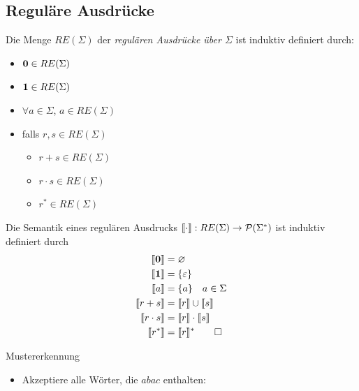 {\subsection{Reguläre Ausdrücke}
\begin{Def}[name={[RE($\Sigma$)]}]
        Die Menge $RE(\Sigma)$ der \emph{regulären Ausdrücke über $\Sigma$} ist induktiv definiert durch:
        \begin{itemize}
        \item $\mathbf{0}\in RE(\Sigma)$
        \item $\mathbf{1}\in RE(\Sigma)$
        \item $\forall a\in\Sigma$, $a\in RE(\Sigma)$
        \item falls $r,s\in RE(\Sigma)$
                \begin{itemize}[label=\textbullet]
                \item $r+s\in RE(\Sigma)$
                \item $r\cdot s\in RE(\Sigma)$
                \item $r^*\in RE(\Sigma)$
                \end{itemize}
        \end{itemize}
\end{Def}
\begin{Def}[name={[Semantik eines regulären Ausdrucks]}]
        Die Semantik eines regulären Ausdrucks $\llbracket\cdot \rrbracket : RE(\Sigma) \-> \mathcal{P}(\Sigma^*)$ ist induktiv definiert durch
        \begin{align*}
                \llbracket \mathbf{0} \rrbracket &= \varnothing\\
                \llbracket \mathbf{1} \rrbracket &= \{\varepsilon\}\\
                \llbracket a \rrbracket &= \{a\} \quad a\in\Sigma\\
                \llbracket r+s \rrbracket &= \llbracket r\rrbracket \cup \llbracket s\rrbracket\\
                \llbracket r\cdot s \rrbracket &= \llbracket r\rrbracket \cdot \llbracket s\rrbracket\\
                \llbracket r^* \rrbracket &= \llbracket r\rrbracket^* \qedhere
        \end{align*}
\end{Def}
%
    \begin{Bsp*} Mustererkennung
        \begin{itemize}
        \item Akzeptiere alle Wörter, die $abac$ enthalten: 

\end{itemize}
\end{Bsp*}}
